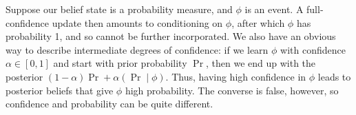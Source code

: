 \begin{example} \label{ex:prob-simple}
Suppose
our belief state is a probability measure, and $\phi$ is an event. 
A full-confidence update then amounts to conditioning on $\phi$, after which $\phi$ has probability 1, and so cannot be further incorporated.
We also have an obvious way to describe intermediate degrees of confidence:
if we learn $\phi$ with confidence
$\alpha \in [0,1]$
and start with prior probability $\Pr$, then we end up with the
posterior $(1-\alpha)\Pr + \alpha (\Pr\mid \phi)$.
%
Thus, having high confidence in $\phi$ leads to posterior beliefs that give $\phi$
high
probability.
The converse is false, however, so
confidence and probability can be quite different.
% 

\end{example}
